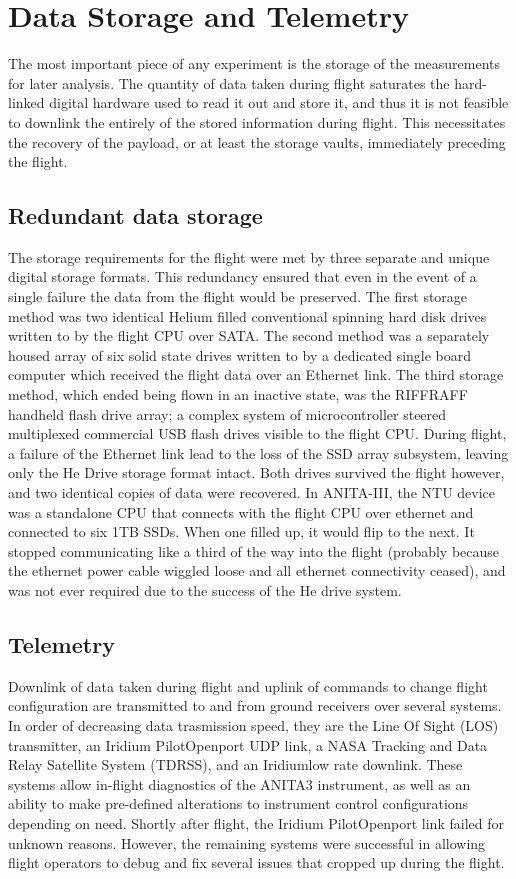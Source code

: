 \section{Data Storage and Telemetry}
	The most important piece of any experiment is the storage of the measurements for later analysis.  The quantity of data taken during flight saturates the hard-linked digital hardware used to read it out and store it, and thus it is not feasible to downlink the entirely of the stored information during flight.  This necessitates the recovery of the payload, or at least the storage vaults, immediately preceding the flight.

	\subsection{Redundant data storage}
		The storage requirements for the flight were met by three separate and unique digital storage formats.  This redundancy ensured that even in the event of a single failure the data from the flight would be preserved.  The first storage method was two identical Helium filled conventional spinning hard disk drives written to by the flight CPU over SATA.  The second method was a separately housed array of six solid state drives written to by a dedicated single board computer which received the flight data over an Ethernet link.  The third storage method, which ended being flown in an inactive state, was the RIFFRAFF handheld flash drive array; a complex system of microcontroller steered multiplexed commercial USB flash drives visible to the flight CPU.  During flight, a failure of the Ethernet link lead to the loss of the SSD array subsystem, leaving only the He Drive storage format intact.  Both drives survived the flight however, and two identical copies of data were recovered.
		In ANITA-III, the NTU device was a standalone CPU that connects with the flight CPU over ethernet and connected to six 1TB SSDs.  When one filled up, it would flip to the next.  It stopped communicating like a third of the way into the flight (probably because the ethernet power cable wiggled loose and all ethernet connectivity ceased), and was not ever required due to the success of the He drive system.
		
	
	\subsection{Telemetry}
		Downlink of data taken during flight and uplink of commands to change flight configuration are transmitted to and from ground receivers over several systems.  In order of decreasing data trasmission speed, they are the Line Of Sight (LOS) transmitter, an Iridium Pilot\textregistered Openport UDP link, a NASA Tracking and Data Relay Satellite System (TDRSS), and an Iridium\textregistered low rate downlink.  These systems allow in-flight diagnostics of the ANITA3 instrument, as well as an ability to make pre-defined alterations to instrument control configurations depending on need.  Shortly after flight, the Iridium Pilot\textregistered Openport link failed for unknown reasons.  However, the remaining systems were successful in allowing flight operators to debug and fix several issues that cropped up during the flight.
		

